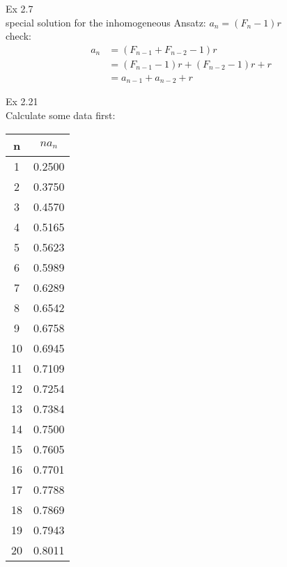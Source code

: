 \documentclass{article}
\begin{document}
  

Ex 2.7\\
special solution for the inhomogeneous
Ansatz: $a_n = (F_n - 1)r$\\
check: 
\begin{align*}
	a_n &= (F_{n-1} + F_{n-2} -1) r\\
		&= (F_{n-1}-1)r + (F_{n-2} - 1)r + r\\
		&= a_{n-1} + a_{n-2} + r
\end{align*}

Ex 2.21\\
Calculate some data first:
\begin{center}
 \begin{tabular}{||c c||} 
 \hline
 n & $na_n$\\ [0.5ex] 
 \hline\hline
 1 & 0.2500\\
  2 & 0.3750\\
  3 & 0.4570\\
  4 & 0.5165\\
  5 & 0.5623\\
  6 & 0.5989\\
  7 & 0.6289\\
  8 & 0.6542\\
  9 & 0.6758\\
 10 & 0.6945\\
 11 & 0.7109\\
 12 & 0.7254\\
 13 & 0.7384\\
 14 & 0.7500\\
 15 & 0.7605\\
 16 & 0.7701\\
 17 & 0.7788\\
 18 & 0.7869\\
 19 & 0.7943\\
 20 & 0.8011\\ [1ex] 
 \hline
\end{tabular}
\end{center}
\end{document}
